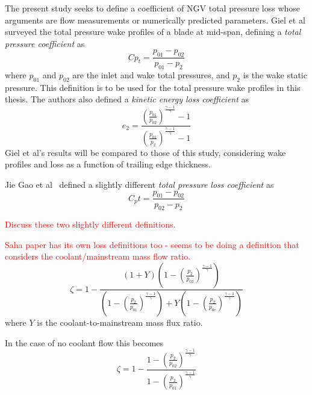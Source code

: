 \documentclass[a4paper, 11pt, twoside]{report}
\begin{document}
The present study seeks to define a coefficient of NGV total pressure loss whose arguments are flow measurements or numerically predicted parameters. Giel et al surveyed the total pressure wake profiles of a blade at mid-span, defining a \textit{total pressure coefficient} as
\begin{equation}
Cp_t = \frac{
p_{01} - p_{02}
}{
p_{01} - p_2
}
\end{equation}
where $p_{01}$ and $p_{02}$ are the inlet and wake total pressures, and $p_2$ is the wake static pressure. This definition is to be used for the total pressure wake profiles in this thesis. The authors also defined a \textit{kinetic energy loss coefficient} as
\begin{equation}
e_2 = \frac{ 
\left( \frac{p_{01}}{p_{02}} \right)^\frac{\gamma-1}{ \gamma } - 1 
}{
\left( \frac{p_{01}}{p_{2}} \right)^\frac{\gamma-1}{ \gamma } - 1 
}
\end{equation}
Giel et al's results will be compared to those of this study, considering wake profiles and loss as a function of trailing edge thickness.

Jie Gao et al~\cite{gao_te} defined a slightly different \textit{total pressure loss coefficient} as
\begin{equation}
C_pt = \frac{
p_{01} - p_{02}
}{
p_{02} - p_2
}
\end{equation}

\textcolor{red}{Discuss these two slightly different definitions.}


 
\textcolor{red}{Saha paper has its own loss definitions too - seems to be doing a definition that considers the coolant/mainstream mass flow ratio.}
\begin{equation}
\zeta = 
1 -
\frac{ 
	\left( 1 + Y \right) 
	\left(
		1 -
		\left(
			\frac{p_2}{p_{02}}
		\right)
		^\frac{\gamma-1}{\gamma}
	\right)
}{
	\left(
		1 -
		\left(
			\frac{p_2}{p_{01}}
		\right)
		^\frac{\gamma-1}{\gamma}
	\right)
	+Y
	\left(
		1 -
		\left(
			\frac{p_2}{p_{0c}}
		\right)
		^\frac{\gamma-1}{\gamma}
	\right)
}
\end{equation}
where $Y$ is the coolant-to-mainstream mass flux ratio.

In the case of no coolant flow this becomes
\begin{equation}
\zeta = 
1 -
\frac{ 
		1 -
		\left(
			\frac{p_2}{p_{02}}
		\right)
		^\frac{\gamma-1}{\gamma}
}{
		1 -
		\left(
			\frac{p_2}{p_{01}}
		\right)
		^\frac{\gamma-1}{\gamma}
}
\end{equation}
\end{document}
